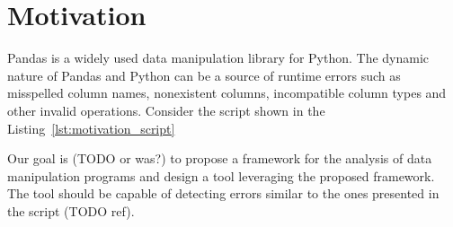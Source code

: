 \section{Motivation}

Pandas is a widely used data manipulation library for Python.
The dynamic nature of Pandas and Python can be a source of runtime errors such as misspelled column names, nonexistent
columns, incompatible column types and other invalid operations.
Consider the script shown in the Listing~\ref{lst:motivation_script}



Our goal is (TODO or was?) to propose a framework for the analysis of data manipulation programs and design a tool
leveraging the proposed framework.
The tool should be capable of detecting errors similar to the ones presented in the script (TODO ref).

